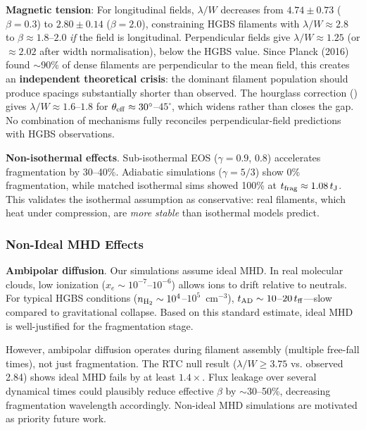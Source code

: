 \documentclass[twocolumn]{mnras}
\begin{document}
\textbf{Magnetic tension}: For longitudinal fields, $\lambda/W$ decreases from $4.74 \pm 0.73$ ($\beta = 0.3$) to $2.80 \pm 0.14$ ($\beta = 2.0$), constraining HGBS filaments with $\lambda/W \approx 2.8$ to $\beta \approx 1.8$--$2.0$ \textit{if} the field is longitudinal. Perpendicular fields give $\lambda/W \approx 1.25$ (or $\approx 2.02$ after width normalisation), below the HGBS value. Since Planck (2016) found $\sim$90\% of dense filaments are perpendicular to the mean field, this creates an \textbf{independent theoretical crisis}: the dominant filament population should produce spacings substantially shorter than observed. The hourglass correction (\citet{Jadhav2026}) gives $\lambda/W \approx 1.6$--$1.8$ for $\theta_{\rm eff} \approx 30^{\circ}$--$45^{\circ}$, which widens rather than closes the gap. No combination of mechanisms fully reconciles perpendicular-field predictions with HGBS observations.

\textbf{Non-isothermal effects}. Sub-isothermal EOS ($\gamma = 0.9$, $0.8$) accelerates fragmentation by 30--40\%. Adiabatic simulations ($\gamma = 5/3$) show 0\% fragmentation, while matched isothermal sims showed 100\% at $t_{\rm frag} \approx 1.08\,t_{\rm J}$. This validates the isothermal assumption as conservative: real filaments, which heat under compression, are {\it more stable} than isothermal models predict.

\subsubsection{Non-Ideal MHD Effects}

\textbf{Ambipolar diffusion}. Our simulations assume ideal MHD. In real molecular clouds, low ionization ($x_e \sim 10^{-7}$--$10^{-6}$) allows ions to drift relative to neutrals. For typical HGBS conditions ($n_{\rm H_2} \sim 10^4$--$10^5$~cm$^{-3}$), $t_{\rm AD} \sim 10$--$20\,t_{\rm ff}$---slow compared to gravitational collapse. Based on this standard estimate, ideal MHD is well-justified for the fragmentation stage.

However, ambipolar diffusion operates during filament assembly (multiple free-fall times), not just fragmentation. The RTC null result ($\lambda/W \geq 3.75$ vs. observed 2.84) shows ideal MHD fails by at least $1.4\times$. Flux leakage over several dynamical times could plausibly reduce effective $\beta$ by $\sim$30--50\%, decreasing fragmentation wavelength accordingly. Non-ideal MHD simulations are motivated as priority future work.
\end{document}
